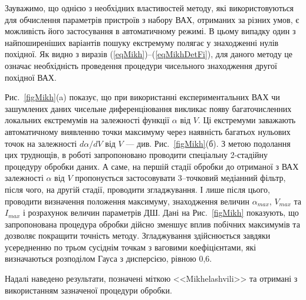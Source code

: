 Зауважимо, що однією з необхідних властивостей методу, які використовуються для обчислення параметрів пристроїв з набору ВАХ, отриманих за різних умов, є можливість його застосування в автоматичному режимі.
В цьому випадку один з найпоширеніших варіантів пошуку екстремуму полягає у знаходженні нулів похідної.
Як видно з виразів (\ref{eqMikh})--(\ref{eqMikhDetFi}), для даного методу це означає необхідність проведення процедури чисельного знаходження другої похідної ВАХ.


Рис.~\ref{figMikh}(a) показує, що при використанні експериментальних ВАХ чи зашумлених даних чисельне диференціювання викликає появу багаточисленних локальних екстремумів на залежності функції $\alpha$ від $V$.
Ці екстремуми заважають автоматичному виявленню точки максимуму через наявність багатьох нульових точок на залежності $d\alpha/dV$ від $V$ --- див. Рис.~\ref{figMikh}(б).
З метою подолання цих труднощів, в роботі запропоновано проводити спеціальну 2-стадійну процедуру обробки даних.
А саме, на першій стадії обробки до отриманої з ВАХ залежності $\alpha$ від $V$ пропонується застосовувати 3--точковий медіанний фільтр, після чого, на другій стадії, проводити згладжування.
І лише після цього, проводити визначення положення максимуму, знаходження величин $\alpha_{max}$, $V_{max}$  та $I_{max}$ і розрахунок величин параметрів ДШ.
Дані на Рис.~\ref{figMikh} показують, що запропонована процедура обробки дійсно зменшує вплив побічних максимумів та дозволяє покращити точність методу.
Згладжування здійснюється завдяки усередненню по трьом сусіднім точкам з ваговими коефіцієнтами, які визначаються розподілом Гауса з дисперсією, рівною 0,6.

Надалі наведено результати, позначені міткою <<Mikhelashvili>> та отримані з використанням зазначеної процедури обробки.


